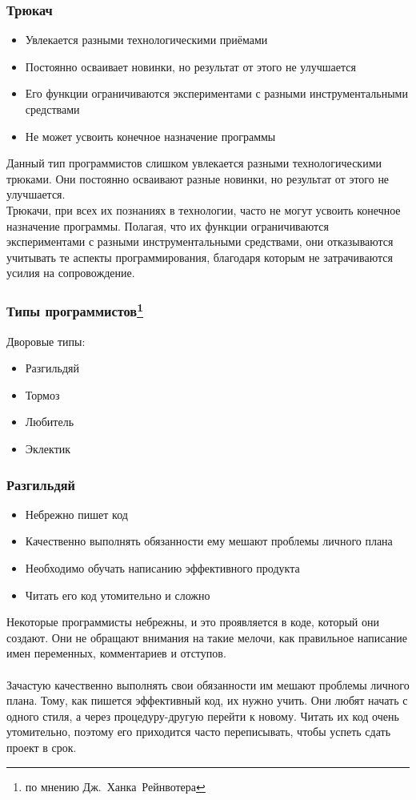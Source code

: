 \documentclass{../industrial-development}
\begin{document}
\begin{frame} \frametitle{Трюкач}
	\begin{itemize}
		\item Увлекается разными технологическими приёмами
		\item Постоянно осваивает новинки, но результат от этого не улучшается
		\item Его функции ограничиваются экспериментами с разными инструментальными средствами
		\item Не может усвоить конечное назначение программы
	\end{itemize}
\end{frame}
\lecturenotes
Данный тип программистов слишком увлекается разными технологическими трюками. Они постоянно осваивают разные новинки, но результат от этого не улучшается. \\ 
	Трюкачи, при всех их познаниях в технологии, часто не могут усвоить конечное назначение программы. Полагая, что их функции ограничиваются экспериментами с разными инструментальными средствами, они отказываются учитывать те аспекты программирования, благодаря которым не затрачиваются усилия на сопровождение. 

\begin{frame} \frametitle{Типы программистов\footnote[1]{по мнению Дж.~Ханка~Рейнвотера}}
	\begin{block}{Дворовые типы:}
\begin{itemize}
\item Разгильдяй
\item Тормоз
\item Любитель
\item Эклектик
\end{itemize}
\end{block}
\end{frame}
\lecturenotes


\begin{frame} \frametitle{Разгильдяй}
	\begin{itemize}
		\item Небрежно пишет код
		\item Качественно выполнять обязанности ему мешают проблемы личного плана
		\item Необходимо обучать написанию эффективного продукта
		\item Читать его код утомительно и сложно
	\end{itemize}	 
\end{frame}
\lecturenotes
Некоторые программисты небрежны, и это проявляется в коде, который они создают. Они не обращают внимания на такие мелочи, как правильное написание имен переменных, комментариев и отступов. \\~\\
Зачастую качественно выполнять свои обязанности им мешают проблемы личного плана. Тому, как пишется эффективный код, их нужно учить. Они любят начать с одного стиля, а через процедуру-другую перейти к новому. Читать их код очень утомительно, поэтому его приходится часто переписывать, чтобы успеть сдать проект в срок. \\
\end{document}
